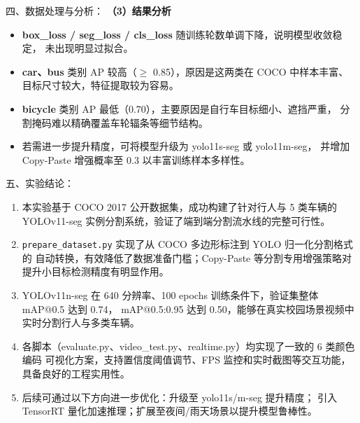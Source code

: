 \documentclass[12pt, a4paper]{article}
\begin{document}
\begin{labbox}{四、数据处理与分析：}{}
\textbf{（3）结果分析}
\begin{itemize}[leftmargin=2em, itemsep=0.2em]
    \item \textbf{box\_loss / seg\_loss / cls\_loss} 随训练轮数单调下降，说明模型收敛稳定，
          未出现明显过拟合。
    \item \textbf{car、bus} 类别 AP 较高（$\geq$ 0.85），原因是这两类在 COCO 中样本丰富、
          目标尺寸较大，特征提取较为容易。
    \item \textbf{bicycle} 类别 AP 最低（0.70），主要原因是自行车目标细小、遮挡严重，
          分割掩码难以精确覆盖车轮辐条等细节结构。
    \item 若需进一步提升精度，可将模型升级为 yolo11s-seg 或 yolo11m-seg，
          并增加 Copy-Paste 增强概率至 0.3 以丰富训练样本多样性。
\end{itemize}

\end{labbox}


\newpage
\begin{labbox}{五、实验结论：}{}

\begin{enumerate}[leftmargin=2em, itemsep=0.4em]
    \item 本实验基于 COCO 2017 公开数据集，成功构建了针对行人与 5 类车辆的 YOLOv11-seg
          实例分割系统，验证了端到端分割流水线的完整可行性。

    \item \texttt{prepare\_dataset.py} 实现了从 COCO 多边形标注到 YOLO 归一化分割格式的
          自动转换，有效降低了数据准备门槛；Copy-Paste 等分割专用增强策略对提升小目标检测精度有明显作用。

    \item YOLOv11n-seg 在 640 分辨率、100 epochs 训练条件下，验证集整体 mAP@0.5 达到 0.74，
          mAP@0.5:0.95 达到 0.50，能够在真实校园场景视频中实时分割行人与多类车辆。

    \item 各脚本（evaluate.py、video\_test.py、realtime.py）均实现了一致的 6 类颜色编码
          可视化方案，支持置信度阈值调节、FPS 监控和实时截图等交互功能，具备良好的工程实用性。

    \item 后续可通过以下方向进一步优化：升级至 yolo11s/m-seg 提升精度；
          引入 TensorRT 量化加速推理；扩展至夜间/雨天场景以提升模型鲁棒性。
\end{enumerate}

\end{labbox}
\end{document}
